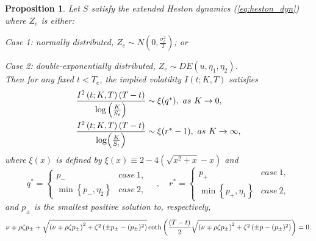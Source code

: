 \documentclass[11pt]{article}
\newtheorem{prop}[theorem]{Proposition}
\numberwithin{equation}{section}
\numberwithin{theorem}{section}
\begin{document}
\begin{prop}\label{prop:asy1}
Let $S$ satisfy the extended Heston dynamics (\ref{eq:heston_dyn})
where $Z_{e}$ is either: 

Case 1: normally distributed, $Z_{e}\sim N\left(0,\frac{\sigma_{e}^{2}}{2}\right)$;
or

Case 2: double-exponentially distributed, $Z_{e}\sim DE\left(u,\eta_{1},\eta_{2}\right)$.
\\
Then for any fixed $t<T_{e}$, the  implied volatility  $I\left(t;K,T\right)$ satisfies 
\begin{align}
\frac{I^{2}\left(t;K,T\right)\left(T-t\right)}{{\log}\left(\frac{K}{S_{t}}\right)} & \sim\mbox{\ensuremath{\xi}\ensuremath{\ensuremath{\left(q^{*}\right)}}},\ as\ \ensuremath{K}\rightarrow\ensuremath{0},\label{eq:asymptotics-11} \\
\frac{\mbox{\ensuremath{I^{2}\left(t;K,T\right)\left(T-t\right)}}}{{\log}\mbox{\ensuremath{\left(\frac{K}{S_{t}}\right)}}} & \sim\mbox{\ensuremath{\xi}\ensuremath{\ensuremath{\left(r^{*}-1\right)}}},\ as\ \ensuremath{K}\rightarrow\ensuremath{\infty},\label{eq:asymptotics-12}
\end{align}
where $\xi\left(x\right)$ is defined by $\xi\left(x\right)\equiv2-4\left(\sqrt{x^{2}+x}-x\right)$
and 
\[
q^{*}=\begin{cases}
p_- & case\ 1,\\
{\min}\left\{ p_-,\eta_{2}\right\}  & case\ 2,
\end{cases}\quad,\quad r^{*}=\begin{cases}
p_+ & case\ 1,\\
\min\left\{ p_+,\eta_{1}\right\}  & case\ 2,
\end{cases}
\]
and $p_{\pm}$ is the smallest positive solution to, respectively,
\[
\nu\mp\rho\zeta p_{\pm}+\mbox{\ensuremath{\sqrt{\left(\nu\mp\rho\zeta p_{\pm}\right)^{2}+\zeta^{2}\left(\pm p_{\pm}-(p_{\pm})^{2}\right)}}}\,{\coth}\left(\frac{\left(T-t\right)}{2}\mbox{\ensuremath{\sqrt{\left(\nu\mp\rho\zeta p_{\pm}\right)^{2}+\zeta^{2}\left(\pm p-(p_{\pm})^{2}\right)}}}\right)=0.
\]
\end{prop}
 
\end{document}
